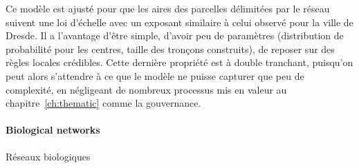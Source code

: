 {\begin{enumerate}
\end{enumerate}
Ce modèle est ajusté pour que les aires des parcelles délimitées par le réseau suivent une loi d'échelle avec un exposant similaire à celui observé pour la ville de Dresde. Il a l'avantage d'être simple, d'avoir peu de paramètres (distribution de probabilité pour les centres, taille des tronçons construits), de reposer sur des règles locales crédibles. Cette dernière propriété est à double tranchant, puisqu'on peut alors s'attendre à ce que le modèle ne puisse capturer que peu de complexité, en négligeant de nombreux processus mis en valeur au chapitre~\ref{ch:thematic} comme la gouvernance.
}

















\paragraph{Biological networks}{Réseaux biologiques}


